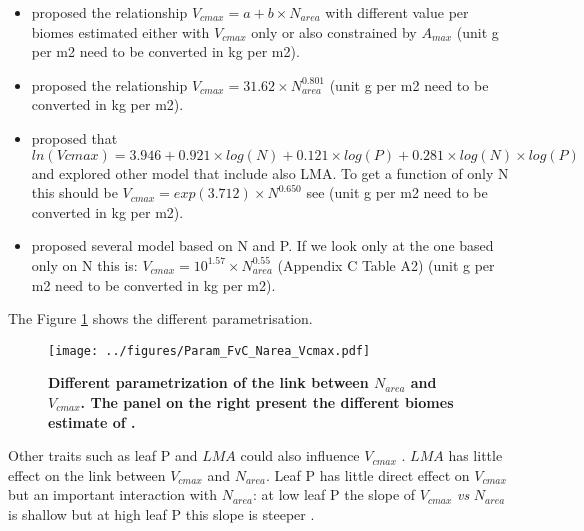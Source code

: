 \documentclass[a4paper,11pt]{article}
\begin{document}
\begin{itemize}

\item \citet{Kattge-2009} proposed the relationship $V_{cmax} = a + b
  \times N_{area}$ with different value per biomes estimated either
  with $V_{cmax}$ only or also constrained by $A_{max}$ (unit g per m2 need to be converted in kg per m2).

\item \citet{Sakschewski-2015} proposed the relationship $V_{cmax} = 31.62 \times N_{area}^{0.801}$ (unit g per m2 need to be converted in kg per m2).

\item  \citet{Walker-2014} proposed that $ln(Vcmax) = 3.946 + 0.921
  \times log(N) + 0.121 \times log(P) + 0.281 \times log(N) \times
  log(P)$ and explored other model that include also LMA. To get a
  function of only N this should be $V_{cmax} = exp(3.712) \times
  N^{0.650}$ see  \citet{Walker-2017} (unit g per m2 need to be converted in kg per m2).

\item \citet{Domingues-2010} proposed several model based on N and P.
  If we look only at the one based only on N this is: $V_{cmax} =
  10^{1.57} \times N_{area}^{0.55}$ (Appendix C Table A2) (unit g per m2 need to be converted in kg per m2).

\end{itemize}

The Figure \ref{fig:Narea_Vcmax} shows the different parametrisation.

\begin{figure}[ht]
\centering
\texttt{[image: ../figures/Param\_FvC\_Narea\_Vcmax.pdf]}
\caption{\textbf{Different parametrization of the link between $N_{area}$ and $V_{cmax}$. The panel on the right present the different biomes estimate of \citet{Kattge-2011}.}
\label{fig:Narea_Vcmax}}
\end{figure}

Other traits such as leaf P and $LMA$ could also influence $V_{cmax}$
\citep{Walker-2014,Domingues-2010}. $LMA$ has little effect on the
link between $V_{cmax}$ and $N_{area}$.  Leaf P has little direct
effect on $V_{cmax}$ but an important interaction with $N_{area}$: at
low leaf P the slope of $V_{cmax}$ \textit{vs} $N_{area}$ is shallow
but at high leaf P this slope is steeper \citep{Walker-2014}.

\end{document}

